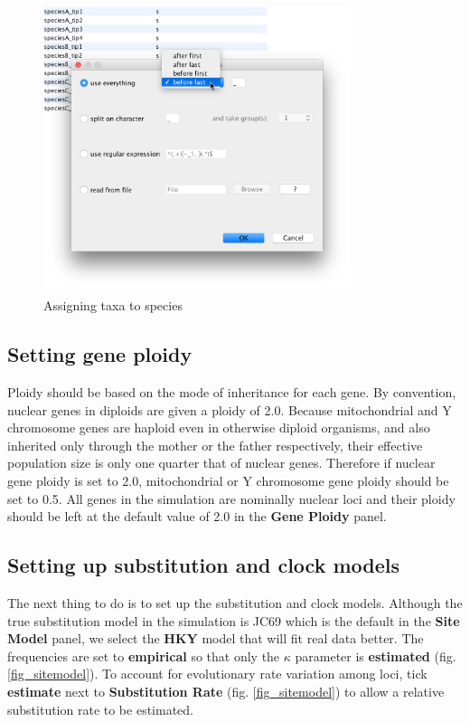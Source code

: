 \documentclass[11pt]{article}
\begin{document}
\begin{figure}[h]
\center
\includegraphics[width=0.8\textwidth]{figs/fig4_mapping.png}
\caption{Assigning taxa to species}
\label{fig_mapping}
\end{figure}

\subsection*{Setting gene ploidy}

Ploidy should be based on the mode of inheritance for each gene. By convention, nuclear genes in diploids are given a ploidy of 2.0. Because mitochondrial and Y chromosome genes are haploid even in otherwise diploid organisms, and also inherited only through the mother or the father respectively, their effective population size is only one quarter that of nuclear genes. Therefore if nuclear gene ploidy is set to 2.0, mitochondrial or Y chromosome gene ploidy should be set to 0.5. All genes in the simulation are nominally nuclear loci and their ploidy should be left at the default value of 2.0 in the \textbf{Gene Ploidy} panel.

\subsection*{Setting up substitution and clock models}

The next thing to do is to set up the substitution and clock models.
Although the true substitution model in the simulation is JC69 which is the default in the \textbf{Site Model} panel, we select the \textbf{HKY} model \citep{Hasegawa:1985ww} that will fit real data better. The frequencies are set to \textbf{empirical} so that only the $\kappa$ parameter is \textbf{estimated} (fig. \ref{fig_sitemodel}).
To account for evolutionary rate variation among loci, tick \textbf{estimate} next to \textbf{Substitution Rate} (fig. \ref{fig_sitemodel}) to allow a relative substitution rate to be estimated.
\end{document}
